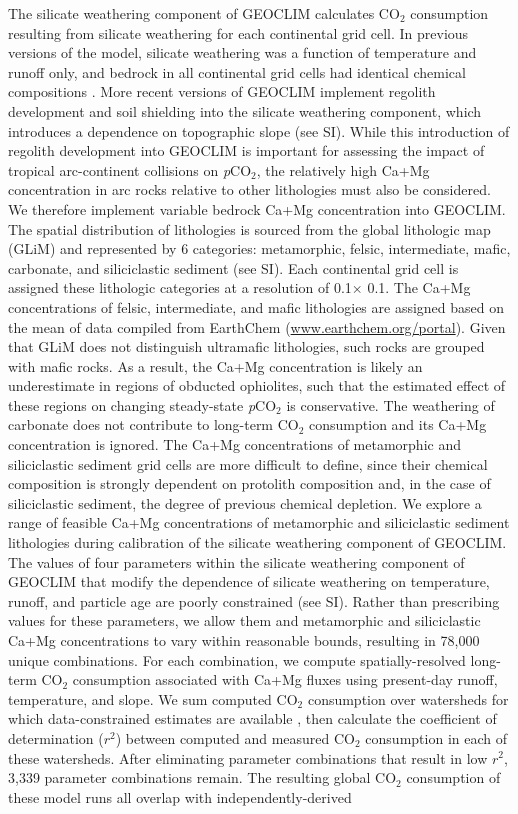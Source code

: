 \documentclass[11pt,letterpaper]{article}
\newcommand{\degrees}{\textdegree\xspace}
\newcommand{\pCOtwo}{\textit{p}CO$_{2}$\xspace}
\newcommand{\COtwo}{CO$_{2}$\xspace}
\begin{document}
The silicate weathering component of GEOCLIM calculates \COtwo consumption resulting from silicate weathering for each continental grid cell. In previous versions of the model, silicate weathering was a function of temperature and runoff only, and bedrock in all continental grid cells had identical chemical compositions \cite{Godderis2014a}. More recent versions of GEOCLIM implement regolith development and soil shielding into the silicate weathering component, which introduces a dependence on topographic slope (see SI). While this introduction of regolith development into GEOCLIM is important for assessing the impact of tropical arc-continent collisions on \pCOtwo, the relatively high Ca+Mg concentration in arc rocks relative to other lithologies must also be considered. We therefore implement variable bedrock Ca+Mg concentration into GEOCLIM. The spatial distribution of lithologies is sourced from the global lithologic map (GLiM) \cite{Hartmann2012a} and represented by 6 categories: metamorphic, felsic, intermediate, mafic, carbonate, and siliciclastic sediment (see SI). Each continental grid cell is assigned these lithologic categories at a resolution of 0.1\degrees $\times$ 0.1\degrees. The Ca+Mg concentrations of felsic, intermediate, and mafic lithologies are assigned based on the mean of data compiled from EarthChem (\url{www.earthchem.org/portal}). Given that GLiM does not distinguish ultramafic lithologies, such rocks are grouped with mafic rocks. As a result, the Ca+Mg concentration is likely an underestimate in regions of obducted ophiolites, such that the estimated effect of these regions on changing steady-state \pCOtwo is conservative. The weathering of carbonate does not contribute to long-term \COtwo consumption and its Ca+Mg concentration is ignored. The Ca+Mg concentrations of metamorphic and siliciclastic sediment grid cells are more difficult to define, since their chemical composition is strongly dependent on protolith composition and, in the case of siliciclastic sediment, the degree of previous chemical depletion. We explore a range of feasible Ca+Mg concentrations of metamorphic and siliciclastic sediment lithologies during calibration of the silicate weathering component of GEOCLIM. The values of four parameters within the silicate weathering component of GEOCLIM \cite{Gabet2009a, West2012a, Maffre2018a} that modify the dependence of silicate weathering on temperature, runoff, and particle age are poorly constrained (see SI). Rather than prescribing values for these parameters, we allow them and metamorphic and siliciclastic Ca+Mg concentrations to vary within reasonable bounds, resulting in 78,000 unique combinations. For each combination, we compute spatially-resolved long-term \COtwo consumption associated with Ca+Mg fluxes using present-day runoff, temperature, and slope. We sum computed \COtwo consumption over watersheds for which data-constrained estimates are available \cite{Gaillardet1999a, Moquet2018a}, then calculate the coefficient of determination ($r^{2}$) between computed and measured \COtwo consumption in each of these watersheds. After eliminating parameter combinations that result in low $r^{2}$, 3,339 parameter combinations remain. The resulting global \COtwo consumption of these model runs all overlap with independently-derived 
\end{document}
